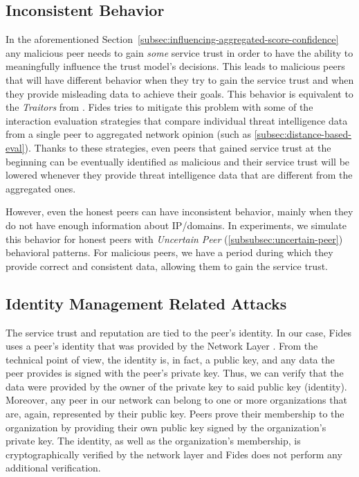 \subsection{Inconsistent Behavior}
\label{subsec:inconsistent-behavior}
In the aforementioned Section~\ref{subsec:influencing-aggregated-score-confidence} any malicious peer needs to gain \textit{some} service trust in order to have the ability to meaningfully influence the trust model's decisions.
This leads to malicious peers that will have different behavior when they try to gain the service trust and when they provide misleading data to achieve their goals.
This behavior is equivalent to the \textit{Traitors} from \cite{KOUTROULI201247}.
Fides tries to mitigate this problem with some of the interaction evaluation strategies that compare individual threat intelligence data from a single peer to aggregated network opinion (such as \ref{subsec:distance-based-eval}).
Thanks to these strategies, even peers that gained service trust at the beginning can be eventually identified as malicious and their service trust will be lowered whenever they provide threat intelligence data that are different from the aggregated ones.

However, even the honest peers can have inconsistent behavior, mainly when they do not have enough information about IP/domains.
In experiments, we simulate this behavior for honest peers with \textit{Uncertain Peer} (\ref{subsubsec:uncertain-peer}) behavioral patterns.
For malicious peers, we have a period during which they provide correct and consistent data, allowing them to gain the service trust. 

\subsection{Identity Management Related Attacks}
\label{subsec:identity-management-attacks}
The service trust and reputation are tied to the peer's identity. 
In our case, Fides uses a peer's identity that was provided by the Network Layer \cite{nl}.
From the technical point of view, the identity is, in fact, a public key, and any data the peer provides is signed with the peer's private key. Thus, we can verify that the data were provided by the owner of the private key to said public key (identity).
Moreover, any peer in our network can belong to one or more organizations that are, again, represented by their public key. 
Peers prove their membership to the organization by providing their own public key signed by the organization's private key.
The identity, as well as the organization's membership, is cryptographically verified by the network layer \cite{nl} and Fides does not perform any additional verification. 

